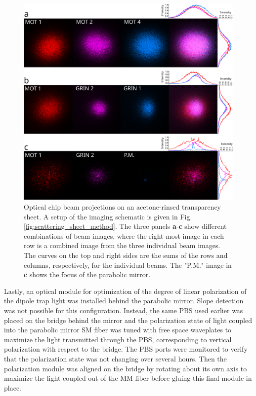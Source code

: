 \begin{figure}[t!]
    \centering
    \includegraphics[width=\textwidth]{Images/transparency_sheet_beam_projections.pdf}
    \caption{Optical chip beam projections on an acetone-rinsed transparency sheet. A setup of the imaging schematic is given in Fig. \ref{fig:scattering_sheet_method}. The three panels \textbf{a}-\textbf{c} show different combinations of beam images, where the right-most image in each row is a combined image from the three individual beam images. The curves on the top and right sides are the sums of the rows and columns, respectively, for the individual beams. The "P.M." image in \textbf{c} shows the focus of the parabolic mirror.}
    \label{fig:final_beam_projections}
\end{figure}

Lastly, an optical module for optimization of the degree of linear polarization of the dipole trap light was installed behind the parabolic mirror. Slope detection was not possible for this configuration. Instead, the same PBS used earlier was placed on the bridge behind the mirror and the polarization state of light coupled into the parabolic mirror SM fiber was tuned with free space waveplates to maximize the light transmitted through the PBS, corresponding to vertical polarization with respect to the bridge. The PBS ports were monitored to verify that the polarization state was not changing over several hours. Then the polarization module was aligned on the bridge by rotating about its own axis to maximize the light coupled out of the MM fiber before gluing this final module in place.


